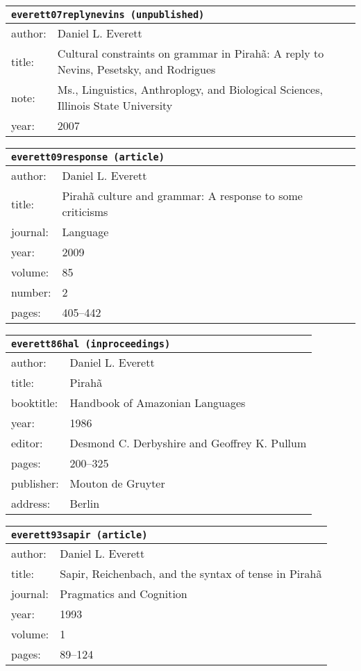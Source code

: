 \documentclass{article}
\begin{document}
\bigskip

\begin{tabular}{p{}p{}}
\multicolumn{2}{l}{\texttt{everett07replynevins (unpublished)}}\\
\hline
author: & Daniel L. Everett\\
title: & Cultural constraints on grammar in \textsc{P}irah{\~a}: A reply to \textsc{N}evins, \textsc{P}esetsky, and \textsc{R}odrigues\\
note: & Ms., Linguistics, Anthroplogy, and Biological Sciences, Illinois State University\\
year: & 2007\\
\end{tabular}

\bigskip

\begin{tabular}{p{}p{}}
\multicolumn{2}{l}{\texttt{everett09response (article)}}\\
\hline
author: & Daniel L. Everett\\
title: & Pirah{\~a} culture and grammar: A response to some criticisms\\
journal: & Language\\
year: & 2009\\
volume: & 85\\
number: & 2\\
pages: & 405--442\\
\end{tabular}

\bigskip

\begin{tabular}{p{}p{}}
\multicolumn{2}{l}{\texttt{everett86hal (inproceedings)}}\\
\hline
author: & Daniel L. Everett\\
title: & Pirah{\~a}\\
booktitle: & Handbook of Amazonian Languages\\
year: & 1986\\
editor: & Desmond C. Derbyshire and Geoffrey K. Pullum\\
pages: & 200--325\\
publisher: & Mouton de Gruyter\\
address: & Berlin\\
\end{tabular}

\bigskip

\begin{tabular}{p{}p{}}
\multicolumn{2}{l}{\texttt{everett93sapir (article)}}\\
\hline
author: & Daniel L. Everett\\
title: & Sapir, \textsc{R}eichenbach, and the syntax of tense in \textsc{P}irah{\~a}\\
journal: & Pragmatics and Cognition\\
year: & 1993\\
volume: & 1\\
pages: & 89--124\\
\end{tabular}
\end{document}

